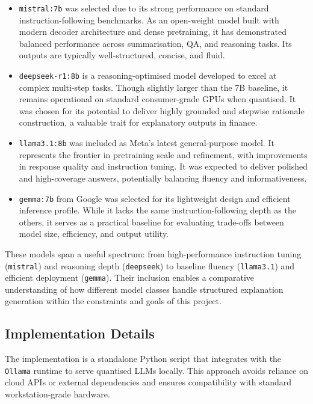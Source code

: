 \begin{itemize}
    \item \texttt{mistral:7b} was selected due to its strong performance on standard instruction-following benchmarks. As an open-weight model built with modern decoder architecture and dense pretraining, it has demonstrated balanced performance across summarisation, QA, and reasoning tasks. Its outputs are typically well-structured, concise, and fluid.
    
    \item \texttt{deepseek-r1:8b} is a reasoning-optimised model developed to excel at complex multi-step tasks. Though slightly larger than the 7B baseline, it remains operational on standard consumer-grade GPUs when quantised. It was chosen for its potential to deliver highly grounded and stepwise rationale construction, a valuable trait for explanatory outputs in finance.
    
    \item \texttt{llama3.1:8b} was included as Meta’s latest general-purpose model. It represents the frontier in pretraining scale and refinement, with improvements in response quality and instruction tuning. It was expected to deliver polished and high-coverage answers, potentially balancing fluency and informativeness.
    
    \item \texttt{gemma:7b} from Google was selected for its lightweight design and efficient inference profile. While it lacks the same instruction-following depth as the others, it serves as a practical baseline for evaluating trade-offs between model size, efficiency, and output utility.
\end{itemize}

These models span a useful spectrum: from high-performance instruction tuning (\texttt{mistral}) and reasoning depth (\texttt{deepseek}) to baseline fluency (\texttt{llama3.1}) and efficient deployment (\texttt{gemma}). Their inclusion enables a comparative understanding of how different model classes handle structured explanation generation within the constraints and goals of this project.

\subsection{Implementation Details}

The implementation is a standalone Python script that integrates with the \texttt{Ollama} runtime to serve quantised LLMs locally. This approach avoids reliance on cloud APIs or external dependencies and ensures compatibility with standard workstation-grade hardware.

